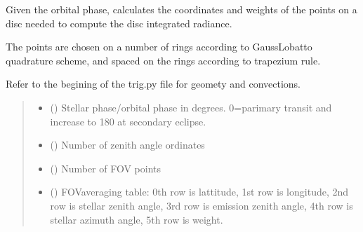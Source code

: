 \documentclass[letterpaper,10pt,english]{sphinxmanual}
\begin{document}
\begin{fulllineitems}
\label{\detokenize{api:nemesispy.gauss_lobatto_weights}}
\pysigstartsignatures
{}
\pysigstopsignatures
\sphinxAtStartPar
Given the orbital phase, calculates the coordinates and weights of the points
on a disc needed to compute the disc integrated radiance.

\sphinxAtStartPar
The points are chosen on a number of rings according to Gauss\sphinxhyphen{}Lobatto quadrature
scheme, and spaced on the rings according to trapezium rule.

\sphinxAtStartPar
Refer to the begining of the trig.py file for geomety and convections.
\begin{quote}\begin{description}
\begin{itemize}
\item {} 
\sphinxAtStartPar
{} () \textendash{} Stellar phase/orbital phase in degrees.
0=parimary transit and increase to 180 at secondary eclipse.

\item {} 
\sphinxAtStartPar
{} () \textendash{} Number of zenith angle ordinates

\end{itemize}

\sphinxAtStartPar
\begin{itemize}
\item {} 
\sphinxAtStartPar
{} () \textendash{} Number of FOV points

\item {} 
\sphinxAtStartPar
{} () \textendash{} FOV\sphinxhyphen{}averaging table:
0th row is lattitude, 1st row is longitude, 2nd row is stellar zenith
angle, 3rd row is emission zenith angle, 4th row is stellar azimuth angle,
5th row is weight.

\end{itemize}


\end{description}\end{quote}

\end{fulllineitems}
\end{document}
